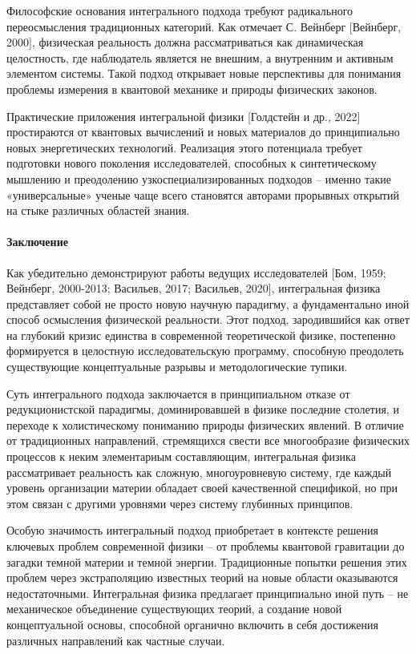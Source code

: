     Философские основания интегрального подхода требуют радикального переосмысления традиционных категорий. Как отмечает С. Вейнберг [Вейнберг, 2000], физическая реальность должна рассматриваться как динамическая целостность, где наблюдатель является не внешним, а внутренним и активным элементом системы. Такой подход открывает новые перспективы для понимания проблемы измерения в квантовой механике и природы физических законов.

    Практические приложения интегральной физики [Голдстейн и др., 2022] простираются от квантовых вычислений и новых материалов до принципиально новых энергетических технологий. Реализация этого потенциала требует подготовки нового поколения исследователей, способных к синтетическому мышлению и преодолению узкоспециализированных подходов – именно такие «универсальные» ученые чаще всего становятся авторами прорывных открытий на стыке различных областей знания.

    \paragraph*{Заключение}
    Как убедительно демонстрируют работы ведущих исследователей [Бом, 1959; Вейнберг, 2000-2013; Васильев, 2017; Васильев, 2020], интегральная физика представляет собой не просто новую научную парадигму, а фундаментально иной способ осмысления физической реальности. Этот подход, зародившийся как ответ на глубокий кризис единства в современной теоретической физике, постепенно формируется в целостную исследовательскую программу, способную преодолеть существующие концептуальные разрывы и методологические тупики.

    Суть интегрального подхода заключается в принципиальном отказе от редукционистской парадигмы, доминировавшей в физике последние столетия, и переходе к холистическому пониманию природы физических явлений. В отличие от традиционных направлений, стремящихся свести все многообразие физических процессов к неким элементарным составляющим, интегральная физика рассматривает реальность как сложную, многоуровневую систему, где каждый уровень организации материи обладает своей качественной спецификой, но при этом связан с другими уровнями через систему глубинных принципов.

    Особую значимость интегральный подход приобретает в контексте решения ключевых проблем современной физики – от проблемы квантовой гравитации до загадки темной материи и темной энергии. Традиционные попытки решения этих проблем через экстраполяцию известных теорий на новые области оказываются недостаточными. Интегральная физика предлагает принципиально иной путь – не механическое объединение существующих теорий, а создание новой концептуальной основы, способной органично включить в себя достижения различных направлений как частные случаи.

